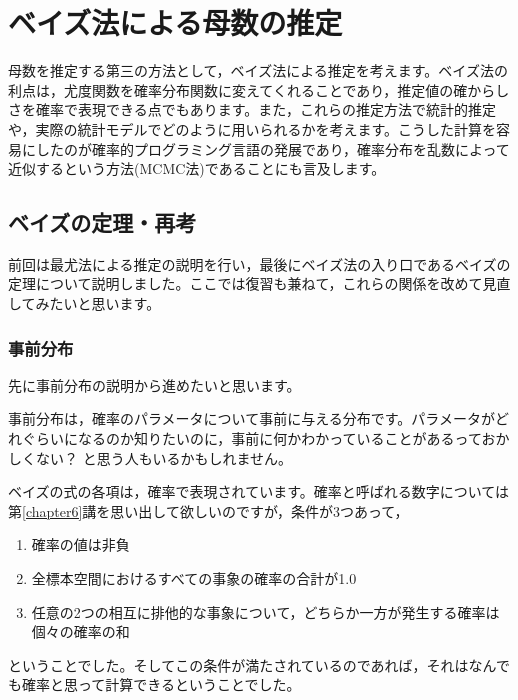 \documentclass{ltjsarticle}
\begin{document}
\chapter{ベイズ法による母数の推定}
\label{chapter25}
母数を推定する第三の方法として，ベイズ法による推定を考えます。ベイズ法の利点は，尤度関数を確率分布関数に変えてくれることであり，推定値の確からしさを確率で表現できる点でもあります。また，これらの推定方法で統計的推定や，実際の統計モデルでどのように用いられるかを考えます。こうした計算を容易にしたのが確率的プログラミング言語の発展であり，確率分布を乱数によって近似するという方法(MCMC法)であることにも言及します。
\section{ベイズの定理・再考}
前回は最尤法による推定の説明を行い，最後にベイズ法の入り口であるベイズの定理について説明しました。ここでは復習も兼ねて，これらの関係を改めて見直してみたいと思います。

\subsection{事前分布}
先に事前分布の説明から進めたいと思います。

事前分布は，確率のパラメータについて事前に与える分布です。パラメータがどれぐらいになるのか知りたいのに，事前に何かわかっていることがあるっておかしくない？ と思う人もいるかもしれません。

ベイズの式の各項は，確率で表現されています。確率と呼ばれる数字については第\ref{chapter6}講を思い出して欲しいのですが，条件が3つあって，
\begin{enumerate}
	\item 確率の値は非負
	\item 全標本空間におけるすべての事象の確率の合計が1.0
	\item 任意の2つの相互に排他的な事象について，どちらか一方が発生する確率は個々の確率の和
\end{enumerate}
ということでした。そしてこの条件が満たされているのであれば，それはなんでも確率と思って計算できるということでした。
\end{document}
